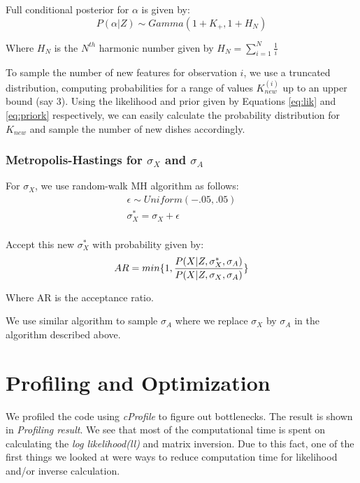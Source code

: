 \documentclass{article}
\begin{document}
Full conditional posterior for $\alpha$ is given by:
\begin{equation}\label{eq:postalpha}
P(\alpha|Z) \sim Gamma(1+K_+,1+H_N)
\end{equation}

Where $H_N$ is the $N^{th}$ harmonic number given by $H_N=\sum_{i=1}^{N} \frac{1}{i}$

To sample the number of new features for observation $i$, we use a truncated distribution, computing probabilities for a range of values $K_{new}^{(i)}$ up to an upper bound (say 3). Using the likelihood and prior given by Equations \eqref{eq:lik} and \eqref{eq:priork} respectively, we can easily calculate the probability distribution for $K_{new}$ and sample the number of new dishes accordingly.




\subsubsection{Metropolis-Hastings for $\sigma_X$ and $\sigma_A$}
For $\sigma_X$, we use random-walk MH algorithm as follows:
\begin{eqnarray}
\epsilon \sim Uniform(-.05,.05)\\
\sigma_X^{*} =  \sigma_X +\epsilon\\
\end{eqnarray}

Accept this new $\sigma_X^{*}$ with probability given by:
\begin{equation}
AR = min\{1,\frac{P(X|Z, \sigma_X^{*}, \sigma_A)}{P(X|Z, \sigma_X,\sigma_A)}\}\\
\end{equation}

Where AR is the acceptance ratio.

We use similar algorithm to sample $\sigma_A$ where we replace $\sigma_X$ by $\sigma_A$ in the algorithm described above.



\section{Profiling and Optimization}
We profiled the code using \textit{cProfile} to figure out bottlenecks. The result is shown in \textit{Profiling result}. We see that most of the computational time is spent on calculating the \textit{log likelihood(ll)}  and matrix inversion. Due to this fact, one of the first things we looked at were ways to reduce computation time for likelihood and/or inverse calculation.\\
\end{document}
